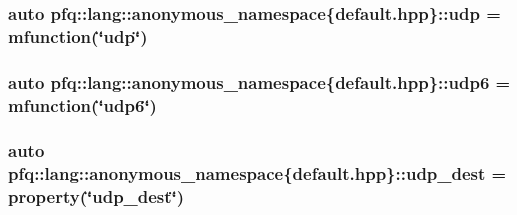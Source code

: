 \hypertarget{namespacepfq_1_1lang_1_1anonymous__namespace_02default_8hpp_03_a0b8b927aad3be7034521ebde0dabf7d3}{
\subsubsection[{udp}]{\setlength{\rightskip}{0pt plus 5cm}auto pfq\+::lang\+::anonymous\+\_\+namespace\{default.\+hpp\}\+::udp = {\bf mfunction}(\char`\"{}udp\char`\"{})}}\label{namespacepfq_1_1lang_1_1anonymous__namespace_02default_8hpp_03_a0b8b927aad3be7034521ebde0dabf7d3}
\hypertarget{namespacepfq_1_1lang_1_1anonymous__namespace_02default_8hpp_03_a37f7f4eb5cff8508b956eba7dee75a45}{
\subsubsection[{udp6}]{\setlength{\rightskip}{0pt plus 5cm}auto pfq\+::lang\+::anonymous\+\_\+namespace\{default.\+hpp\}\+::udp6 = {\bf mfunction}(\char`\"{}udp6\char`\"{})}}\label{namespacepfq_1_1lang_1_1anonymous__namespace_02default_8hpp_03_a37f7f4eb5cff8508b956eba7dee75a45}
\hypertarget{namespacepfq_1_1lang_1_1anonymous__namespace_02default_8hpp_03_a7c15d9ec0af24b9515acc8a04b7b1e2e}{
\subsubsection[{udp\+\_\+dest}]{\setlength{\rightskip}{0pt plus 5cm}auto pfq\+::lang\+::anonymous\+\_\+namespace\{default.\+hpp\}\+::udp\+\_\+dest = {\bf property}(\char`\"{}udp\+\_\+dest\char`\"{})}}\label{namespacepfq_1_1lang_1_1anonymous__namespace_02default_8hpp_03_a7c15d9ec0af24b9515acc8a04b7b1e2e}
